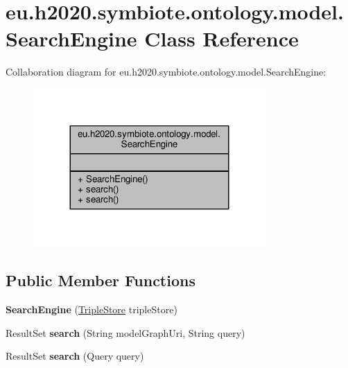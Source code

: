 \hypertarget{classeu_1_1h2020_1_1symbiote_1_1ontology_1_1model_1_1SearchEngine}{}\section{eu.\+h2020.\+symbiote.\+ontology.\+model.\+Search\+Engine Class Reference}
\label{classeu_1_1h2020_1_1symbiote_1_1ontology_1_1model_1_1SearchEngine}


Collaboration diagram for eu.\+h2020.\+symbiote.\+ontology.\+model.\+Search\+Engine\+:
\nopagebreak
\begin{figure}[H]
\begin{center}
\leavevmode
\includegraphics[width=251pt]{classeu_1_1h2020_1_1symbiote_1_1ontology_1_1model_1_1SearchEngine__coll__graph}
\end{center}
\end{figure}
\subsection*{Public Member Functions}
\begin{DoxyCompactItemize}
\item 
{\bfseries Search\+Engine} (\hyperlink{classeu_1_1h2020_1_1symbiote_1_1ontology_1_1model_1_1TripleStore}{Triple\+Store} triple\+Store)\hypertarget{classeu_1_1h2020_1_1symbiote_1_1ontology_1_1model_1_1SearchEngine_a2327a125eb5fdbe1e6ef334a3e67f04b}{}\label{classeu_1_1h2020_1_1symbiote_1_1ontology_1_1model_1_1SearchEngine_a2327a125eb5fdbe1e6ef334a3e67f04b}

\item 
Result\+Set {\bfseries search} (String model\+Graph\+Uri, String query)\hypertarget{classeu_1_1h2020_1_1symbiote_1_1ontology_1_1model_1_1SearchEngine_ac5e5ea7afb2d572c1eff6e480ace3b45}{}\label{classeu_1_1h2020_1_1symbiote_1_1ontology_1_1model_1_1SearchEngine_ac5e5ea7afb2d572c1eff6e480ace3b45}

\item 
Result\+Set {\bfseries search} (Query query)\hypertarget{classeu_1_1h2020_1_1symbiote_1_1ontology_1_1model_1_1SearchEngine_ab99e37e222402f39a899f696e40c962d}{}\label{classeu_1_1h2020_1_1symbiote_1_1ontology_1_1model_1_1SearchEngine_ab99e37e222402f39a899f696e40c962d}

\end{DoxyCompactItemize}


